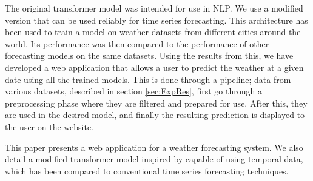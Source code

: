 The original transformer model was intended for use in NLP.
We use a modified version that can be used reliably for time series forecasting.
This architecture has been used to train a model on weather datasets from different cities around the world.
Its performance was then compared to the performance of other forecasting models on the same datasets. 
Using the results from this, we have developed a web application that allows a user to predict the weather at a given date using all the trained models.
This is done through a pipeline; data from various datasets, described in section \ref{sec:ExpRes}, first go through a preprocessing phase where they are filtered and prepared for use.
After this, they are used in the desired model, and finally the resulting prediction is displayed to the user on the website.  

This paper presents a web application for a weather forecasting system.
We also detail a modified transformer model inspired by \citet{schmitz_stock_2020} capable of using temporal data, which has been compared to conventional time series forecasting techniques.
